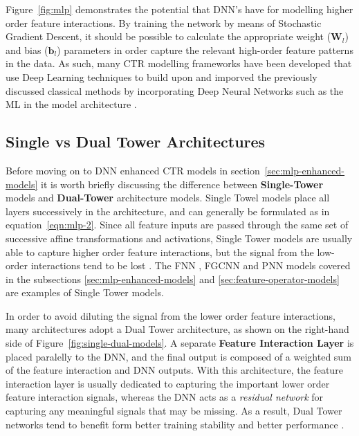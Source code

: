 \documentclass{mldsmsc}
\begin{document}
Figure~\ref{fig:mlp} demonstrates the potential that DNN's have for modelling higher order feature
interactions. By training the network by means of Stochastic Gradient Descent, it should be
possible to calculate the appropriate weight ($\mathbf{W}_l$) and bias ($\mathbf{b}_l$) parameters
in order capture the relevant high-order feature patterns in the data. As such, many CTR
modelling frameworks have been developed that use Deep Learning techniques to build upon and
imporved the previously discussed classical methods by incorporating Deep Neural Networks such
as the ML in the model architecture \citep{RefWorks:zhang2021deep}.

\subsection{Single vs Dual Tower Architectures}

Before moving on to DNN enhanced CTR models in section~\ref{sec:mlp-enhanced-models}
it is worth briefly discussing the difference between \textbf{Single-Tower}
models and \textbf{Dual-Tower} architecture models. Single Towel models place
all layers successively in the architecture, and can generally be formulated
as in equation~\ref{eqn:mlp-2}. Since all feature inputs are passed through
the same set of successive affine transformations and activations, Single Tower
models are usually able to capture higher order feature interactions, but the signal
from the low-order interactions tend to be lost \citep{RefWorks:zhang2021deep}.
The FNN \citep{RefWorks:zhang2016deep}, FGCNN
\citep{RefWorks:liu2019feature} and PNN \citep{RefWorks:qu2016product-based} models covered in the subsections 
\ref{sec:mlp-enhanced-models} and \ref{sec:feature-operator-models}
are examples of Single Tower models.

In order to avoid diluting the signal from the lower order feature interactions, many architectures
adopt a Dual Tower architecture, as shown on the right-hand side of
Figure~\ref{fig:single-dual-models}. A separate \textbf{Feature Interaction Layer}
is placed paralelly to the DNN, and the final output is composed of a weighted sum
of the feature interaction and DNN outputs. With this architecture, the feature interaction
layer is usually dedicated to capturing the important lower order feature interaction signals,
whereas the DNN acts as a \emph{residual network} for capturing any meaningful signals that may
be missing. As a result, Dual Tower networks tend to benefit form better training stability and
better performance \citep{RefWorks:zhang2021deep}.
\end{document}

